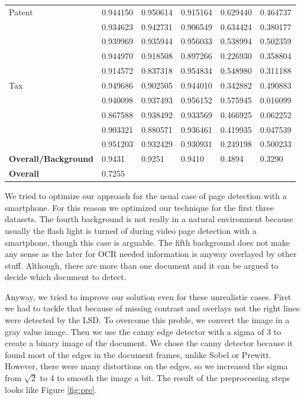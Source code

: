 \documentclass[english, paper=a4]{scrartcl}
\begin{document}
\begin{table}[]
\begin{tabular}{l | p{2cm}| p{2cm}| p{2cm}| p{2cm}| p{2cm} }
Patent & 0.944150 & 0.950614  &0.915164 &0.629440 &0.464737  \\   
		& 0.934623 & 0.942731  &0.906549 &0.634424 &0.380177  \\ 
		& 0.939969 & 0.935944  &0.956033 &0.538994 &0.502359  \\ 
		& 0.944970 & 0.918508  &0.897266 &0.226930 &0.358804  \\ 
		& 0.914572 & 0.837318  &0.954834 &0.548980 &0.311188  \\ \hline 
Tax & 0.949686 & 0.902505  &0.944010 &0.342882 &0.490883  \\   
		& 0.940098 & 0.937493  &0.956152 &0.575945 &0.016099  \\ 
		& 0.867588 & 0.938492  &0.933569 &0.466925 &0.062252  \\ 
		& 0.903321 & 0.880571  &0.936461 &0.419935 &0.047539  \\ 
		& 0.951203 & 0.932429  &0.930931 &0.249198 &0.500233  \\ 	\hline \hline 
\textbf{Overall/Background} &0.9431 & 0.9251 & 0.9410 & 0.4894 &0.3290\\ \hline 
\textbf{Overall}&	 0.7255					            
\end{tabular}
\label{tab:results}
\end{table}

We tried to optimize our approach for the usual case of page detection
with a smartphone. For this reason we optimized our technique for the first three
datasets. 
The fourth background is not really in a natural environment because usually 
the flash light is turned of during video page detection with a smartphone,
though this case is arguable. 
The fifth background does not make any sense as the later for OCR needed
information is anyway overlayed by other stuff. Although, there are more
than one document and it can be argued to decide which document to detect.

Anyway, we tried to improve our solution even for these unrealistic cases.
First we had to tackle that because of missing contrast and overlays not the 
right lines were detected by the LSD.
To overcome this proble, we convert the image in a gray value image. Then we use the canny edge detector with a sigma of 3 to create a binary image of the document. We chose the canny detector because it found most of the edges in the document frames, unlike Sobel or Prewitt. However, there were many distortions on the edges, so we increased the sigma from $\sqrt{2}$ to 4 to smooth the image a bit. The result of the preprocessing steps looks like Figure \ref{fig:pre}.
\end{document}
